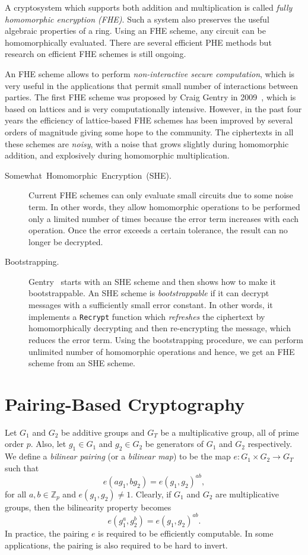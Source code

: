 \documentclass[11pt]{article}
\theoremstyle{plain}
\begin{document}
A cryptosystem which supports both addition and multiplication is
called \textit{fully homomorphic encryption (FHE)}. Such a system
also preserves the useful algebraic properties of a ring. Using an
FHE scheme, any circuit can be homomorphically evaluated. There are
several efficient PHE methods but research on efficient FHE schemes
is still ongoing.

An FHE scheme allows to perform \emph{non-interactive secure computation},
which is very useful in the applications that permit small number
of interactions between parties. The first FHE scheme was proposed
by Craig Gentry in 2009~\cite{Gentry:2009:FHE:1536414.1536440},
which is based on lattices and is very computationally intensive.
However, in the past four years the efficiency of lattice-based FHE
schemes has been improved by several orders of magnitude giving some
hope to the community. The ciphertexts in all these schemes are \emph{noisy},
with a noise that grows slightly during homomorphic addition, and
explosively during homomorphic multiplication.
\begin{description}
	\item [{Somewhat~Homomorphic~Encryption~(SHE).}] Current FHE schemes
	can only evaluate small circuits due to some noise term. In other
	words, they allow homomorphic operations to be performed only a limited
	number of times because the error term increases with each operation.
	Once the error exceeds a certain tolerance, the result can no longer
	be decrypted.
	\item [{Bootstrapping.}] Gentry~\cite{Gentry:2009:FHE:1536414.1536440}
	starts with an SHE scheme and then shows how to make it bootstrappable.
	An SHE scheme is \emph{bootstrappable} if it can decrypt messages
	with a sufficiently small error constant. In other words, it implements
	a \texttt{Recrypt} function which \emph{refreshes} the ciphertext
	by homomorphically decrypting and then re-encrypting the message,
	which reduces the error term. Using the bootstrapping procedure, we
	can perform unlimited number of homomorphic operations and hence,
	we get an FHE scheme from an SHE scheme.
\end{description}

\section{Pairing-Based Cryptography}

Let $G_{1}$ and $G_{2}$ be additive groups and $G_{T}$ be a multiplicative
group, all of prime order $p$. Also, let $g_{1}\in G_{1}$ and $g_{2}\in G_{2}$
be generators of $G_{1}$ and $G_{2}$ respectively. We define a \emph{bilinear
	pairing} (or a \emph{bilinear map}) to be the map $e:G_{1}\times G_{2}\to G_{T}$
such that 
\[
e(ag_{1},bg_{2})=e(g_{1},g_{2})^{ab},
\]
for all $a,b\in\mathbb{Z}_{p}$ and $e(g_{1},g_{2})\neq1$. Clearly,
if $G_{1}$ and $G_{2}$ are multiplicative groups, then the bilinearity
property becomes 
\[
e(g_{1}^{a},g_{2}^{b})=e(g_{1},g_{2})^{ab}.
\]
In practice, the pairing $e$ is required to be efficiently computable.
In some applications, the pairing is also required to be hard to invert.
\end{document}
